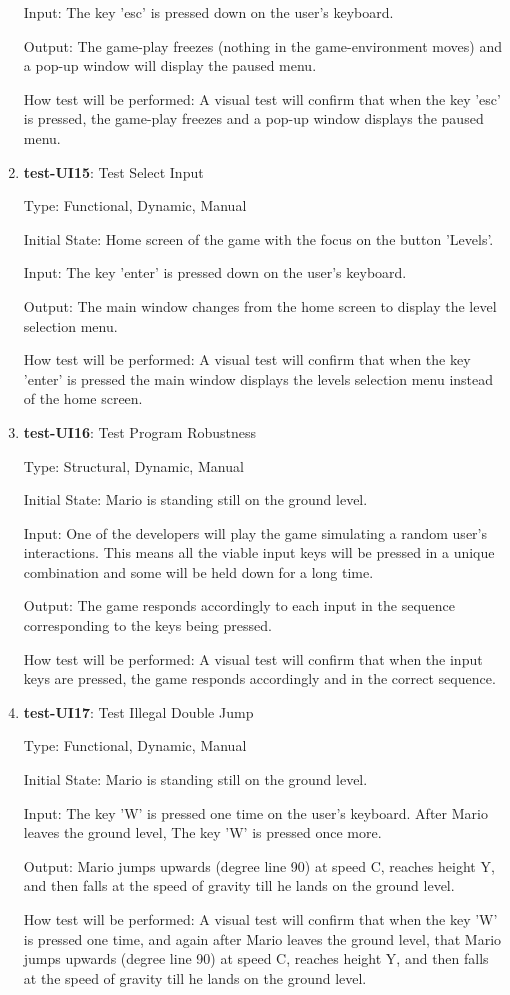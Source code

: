 \documentclass[12pt, titlepage]{article}
\begin{document}
\begin{enumerate}
Input: The key 'esc' is pressed down on the user's keyboard.

Output: The game-play freezes (nothing in the game-environment moves) and a pop-up window will display the paused menu.

How test will be performed: A visual test will confirm that when the key 'esc' is pressed, the game-play freezes and a pop-up window displays the paused menu.

\item{\textbf{test-UI15}: Test Select Input\\}

Type: Functional, Dynamic, Manual

Initial State: Home screen of the game with the focus on the button 'Levels'.

Input: The key 'enter' is pressed down on the user's keyboard.

Output: The main window changes from the home screen to display the level selection menu.

How test will be performed: A visual test will confirm that when the key 'enter' is pressed the main window displays the levels selection menu instead of the home screen.

\item{\textbf{test-UI16}: Test Program Robustness\\}

Type: Structural, Dynamic, Manual

Initial State: Mario is standing still on the ground level.

Input: One of the developers will play the game simulating a random user's interactions. This means all the viable input keys will be pressed in a unique combination and some will be held down for a long time.

Output: The game responds accordingly to each input in the sequence corresponding to the keys being pressed.

How test will be performed: A visual test will confirm that when the input keys are pressed, the game responds accordingly and in the correct sequence.

\item{\textbf{test-UI17}: Test Illegal Double Jump\\}

Type: Functional, Dynamic, Manual

Initial State: Mario is standing still on the ground level.

Input: The key 'W' is pressed one time on the user's keyboard. After Mario leaves the ground level, The key 'W' is pressed once more.

Output: Mario jumps upwards (degree line 90) at speed C, reaches height Y, and then falls at the speed of gravity till he lands on the ground level.

How test will be performed: A visual test will confirm that when the key 'W' is pressed one time, and again after Mario leaves the ground level, that Mario jumps upwards (degree line 90) at speed C, reaches height Y, and then falls at the speed of gravity till he lands on the ground level.

\end{enumerate}
\end{document}
